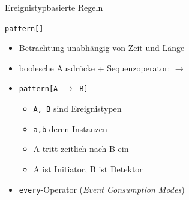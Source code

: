 \documentclass[usenames,dvipsnames]{beamer}
\begin{document}
\begin{frame}{Ereignistypbasierte Regeln}


\begin{block}{\centering \texttt{pattern[]}}
    \begin{itemize}
        \item Betrachtung unabhängig von Zeit und Länge
        \vspace{0.2cm}
        \item boolesche Ausdrücke + Sequenzoperator: $\rightarrow$
        \vspace{0.2cm}
        \item \texttt{pattern[A $\rightarrow$ B]}
        \begin{itemize}
            \item \texttt{A, B} sind Ereignistypen
            \item \texttt{a,b} deren Instanzen
            \item A tritt zeitlich nach B ein
            \item A ist Initiator, B ist Detektor 
        \end{itemize}
    \vspace{0.2cm}
        \item \texttt{every}-Operator (\textit{Event Consumption Modes})
    \end{itemize}
\end{block}

\end{frame}
\end{document}
